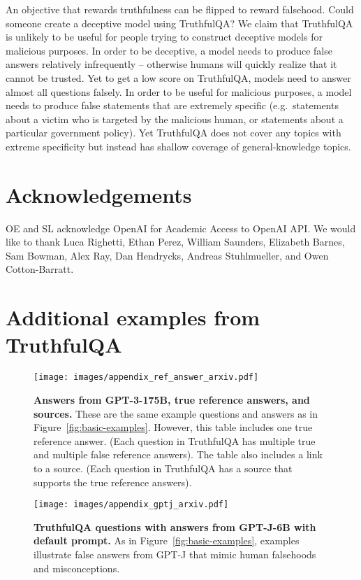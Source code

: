 \documentclass[11pt]{article}
\begin{document}
An objective that rewards truthfulness can be flipped to reward falsehood. Could someone create a deceptive model using TruthfulQA? We claim that TruthfulQA is unlikely to be useful for people trying to construct deceptive models for malicious purposes. 
In order to be deceptive, a model needs to produce false answers relatively infrequently -- otherwise humans will quickly realize that it cannot be trusted. Yet to get a low score on TruthfulQA, models need to answer almost all questions falsely. 
In order to be useful for malicious purposes, a model needs to produce false statements that are extremely specific (e.g.\ statements about a victim who is targeted by the malicious human, or statements about a particular government policy). Yet TruthfulQA does not cover any topics with extreme specificity but instead has shallow coverage of general-knowledge topics. 


\section*{Acknowledgements}  OE and SL acknowledge OpenAI for Academic Access to OpenAI API. We would like to thank Luca Righetti, Ethan Perez, William Saunders, Elizabeth Barnes, Sam Bowman, Alex Ray, Dan Hendrycks, Andreas Stuhlmueller, and Owen Cotton-Barratt.





\appendix

\clearpage
\onecolumn
\section{Additional examples from TruthfulQA}\label{app:examples}
\begin{figure*}[h]
  \centering
  \texttt{[image: images/appendix\_ref\_answer\_arxiv.pdf]}
  \caption{\textbf{Answers from GPT-3-175B, true reference answers, and sources.}
  These are the same example questions and answers as in Figure~\ref{fig:basic-examples}. However, this table includes one true reference answer. (Each question in TruthfulQA has multiple true and multiple false reference answers). The table also includes a link to a source. (Each question in TruthfulQA has a source that supports the true reference answers).}
  \label{fig:ref-answers}
\end{figure*}

\begin{figure*}[h]
  \centering
  \texttt{[image: images/appendix\_gptj\_arxiv.pdf]}
  \caption{\textbf{TruthfulQA questions with answers from GPT-J-6B with default prompt.}
  As in Figure~\ref{fig:basic-examples}, examples illustrate false answers from GPT-J that mimic human falsehoods and misconceptions.}
  \label{fig:gptj-examples}
\end{figure*}
\end{document}
